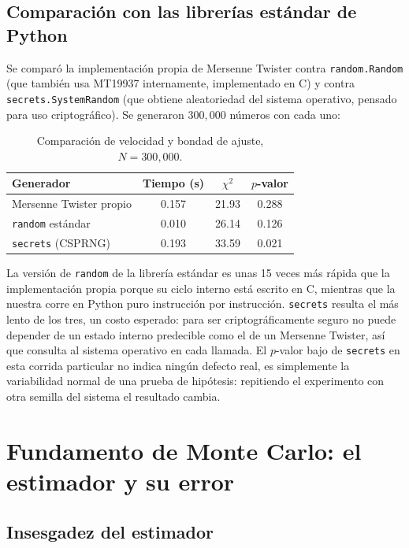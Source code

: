 \documentclass[11pt]{article}
\begin{document}
\subsection{Comparación con las librerías estándar de Python}

Se comparó la implementación propia de Mersenne Twister contra \texttt{random.Random} (que también usa MT19937 internamente, implementado en C) y contra \texttt{secrets.SystemRandom} (que obtiene aleatoriedad del sistema operativo, pensado para uso criptográfico). Se generaron $300{,}000$ números con cada uno:

\begin{table}[H]
\centering
\begin{tabular}{lccc}
\toprule
Generador & Tiempo (s) & $\chi^2$ & $p$-valor \\
\midrule
Mersenne Twister propio & 0.157 & 21.93 & 0.288 \\
\texttt{random} estándar & 0.010 & 26.14 & 0.126 \\
\texttt{secrets} (CSPRNG) & 0.193 & 33.59 & 0.021 \\
\bottomrule
\end{tabular}
\caption{Comparación de velocidad y bondad de ajuste, $N=300{,}000$.}
\end{table}

La versión de \texttt{random} de la librería estándar es unas 15 veces más rápida que la implementación propia porque su ciclo interno está escrito en C, mientras que la nuestra corre en Python puro instrucción por instrucción. \texttt{secrets} resulta el más lento de los tres, un costo esperado: para ser criptográficamente seguro no puede depender de un estado interno predecible como el de un Mersenne Twister, así que consulta al sistema operativo en cada llamada. El $p$-valor bajo de \texttt{secrets} en esta corrida particular no indica ningún defecto real, es simplemente la variabilidad normal de una prueba de hipótesis: repitiendo el experimento con otra semilla del sistema el resultado cambia.

\section{Fundamento de Monte Carlo: el estimador y su error}

\subsection{Insesgadez del estimador}
\end{document}
